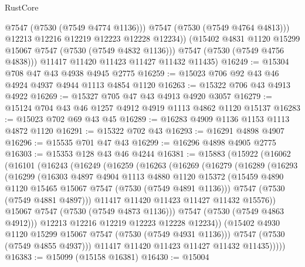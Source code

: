 \begin{lexlean}{RustCore}
\begin{coremodule}
                @7547
                (@7530 (@7549 @4774 @1136)))
              @7547
              (@7530 (@7549 @4764 @4813)))
            @12213
            @12216
            @12219
            @12223
            @12228
            @12234))
        (@15402 @4831 @1120 @15299 @15067 @7547 (@7530 (@7549 @4832 @1136)))
        @7547
        (@7530 (@7549 @4756 @4838)))
      @11417
      @11420
      @11423
      @11427
      @11432
      @11435)
@16249 := @15304 @708 @47 @43 @4938 @4945 @2775
@16259 := @15023 @706 @92 @43 @46 @4924 @4937 @4944 @1113 @4854 @1120
@16263 := @15322 @706 @43 @4913 @4922
@16269 := @15327 @705 @47 @43 @4913 @4920 @3057
@16279 := @15124 @704 @43 @46 @1257 @4912 @4919 @1113 @4862 @1120 @15137
@16283 := @15023 @702 @69 @43 @45
@16289 := @16283 @4909 @1136 @1153 @1113 @4872 @1120
@16291 := @15322 @702 @43
@16293 := @16291 @4898 @4907
@16296 := @15535 @701 @47 @43
@16299 := @16296 @4898 @4905 @2775
@16303 := @15353 @128 @43 @46 @4244
@16381 := @15883
    (@15922
      (@16062
        (@16101
          (@16243
            (@16249
              (@16259
                (@16263
                  (@16269
                    (@16279
                      (@16289
                        (@16293
                          (@16299
                            (@16303
                              @4897
                              @4904
                              @1113
                              @4880
                              @1120
                              @15372
                              (@15459 @4890 @1120 @15465 @15067 @7547 (@7530 (@7549 @4891 @1136)))
                              @7547
                              (@7530 (@7549 @4881 @4897)))
                            @11417
                            @11420
                            @11423
                            @11427
                            @11432
                            @15576))
                        @15067
                        @7547
                        (@7530 (@7549 @4873 @1136)))
                      @7547
                      (@7530 (@7549 @4863 @4912)))
                    @12213
                    @12216
                    @12219
                    @12223
                    @12228
                    @12234))
                (@15402 @4930 @1120 @15299 @15067 @7547 (@7530 (@7549 @4931 @1136)))
                @7547
                (@7530 (@7549 @4855 @4937)))
              @11417
              @11420
              @11423
              @11427
              @11432
              @11435)))))
@16383 := @15099 (@15158 @16381)
@16430 := @15004

\end{coremodule}
\end{lexlean}
